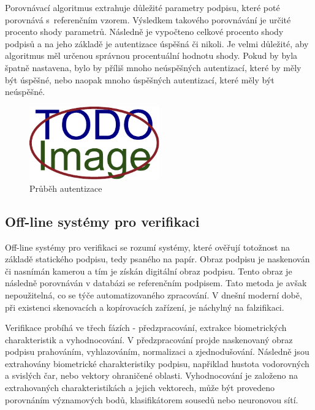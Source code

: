 Porovnávací algoritmus extrahuje důležité parametry podpisu, které poté porovnává s~referenčním vzorem. 
Výsledkem takového porovnávání je určité procento shody parametrů.
Následně je vypočteno celkové procento shody podpisů a na jeho základě je autentizace úspěšná či nikoli.
Je velmi důležité, aby algoritmus měl určenou správnou procentuální hodnotu shody.
Pokud by byla špatně nastavena, bylo by příliš mnoho neúspěšných autentizací, které by měly být úspěšné, nebo naopak mnoho úspěšných autentizací, které měly být neúspěšné.

\begin{figure}[h]
  \centering
  \includegraphics[width=0.5\textwidth]{obrazky-figures/placeholder.pdf}
  \caption{Průběh autentizace}
  \label{fig:my-pdf}
\end{figure}

\subsection{Off-line systémy pro verifikaci}
Off-line systémy pro verifikaci se rozumí systémy, které ověřují totožnost na základě statického podpisu, tedy psaného na papír.  %
Obraz podpisu je naskenován či nasnímán kamerou a tím je získán digitální obraz podpisu.                                          %
Tento obraz je následně porovnáván v databázi se referenčním podpisem.                                                            %
Tato metoda je avšak nepoužitelná, co se týče automatizovaného zpracování.                                                        %
V dnešní moderní době, při existenci skenovacích a kopírovacích zařízení, je náchylný na falzifikaci.                             %

Verifikace probíhá ve třech fázích - předzpracování, extrakce biometrických charakteristik a vyhodnocování. %
V předzpracování projde naskenovaný obraz podpisu prahováním, vyhlazováním, normalizaci a zjednodušování.   %
Následně jsou extrahovány biometrické charakteristiky podpisu,                                              %
napřiklad hustota vodorovných a svislých čar, nebo vektory ohraničené oblasti.                              %
Vyhodnocování je založeno na extrahovaných charakteristikách a jejich vektorech,                            %
může být provedeno porovnáním významových bodů, klasifikátorem sousedů nebo neuronovou sítí.                %

